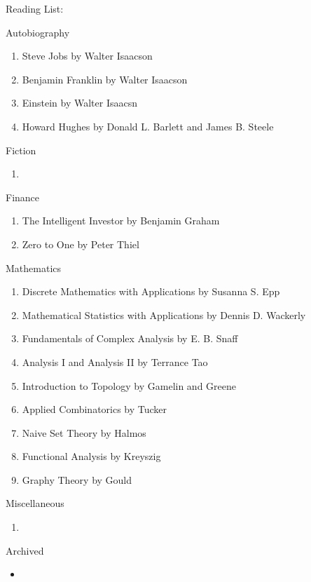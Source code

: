 \documentclass{article}
\begin{document}
\Huge Reading List: 

\hrulefill

\LARGE Autobiography

\normalsize 
    \begin{enumerate}
        \item Steve Jobs by Walter Isaacson
        \item Benjamin Franklin by Walter Isaacson
        \item Einstein by Walter Isaacsn 
        \item Howard Hughes by Donald L. Barlett and James B. Steele
    \end{enumerate}

\LARGE Fiction

\normalsize
    \begin{enumerate}
        \item 
    \end{enumerate}

\LARGE Finance

\normalsize
    \begin{enumerate}
        \item The Intelligent Investor by Benjamin Graham
        \item Zero to One by Peter Thiel
    \end{enumerate}



\LARGE Mathematics

\normalsize
    \begin{enumerate}
        \item Discrete Mathematics with Applications by Susanna S. Epp
        \item Mathematical Statistics with Applications by Dennis D. Wackerly
        \item Fundamentals of Complex Analysis by E. B. Snaff
        \item Analysis I and Analysis II by Terrance Tao
        \item Introduction to Topology by Gamelin and Greene
        \item Applied Combinatorics by Tucker
        \item Naive Set Theory by Halmos
        \item Functional Analysis by Kreyszig
        \item Graphy Theory by Gould
    \end{enumerate}

\LARGE Miscellaneous

\normalsize
    \begin{enumerate}
        \item  
    \end{enumerate}
\hrulefill



\LARGE Archived

\normalsize
    \begin{itemize}
        \item 
    \end{itemize}

    
\end{document}

